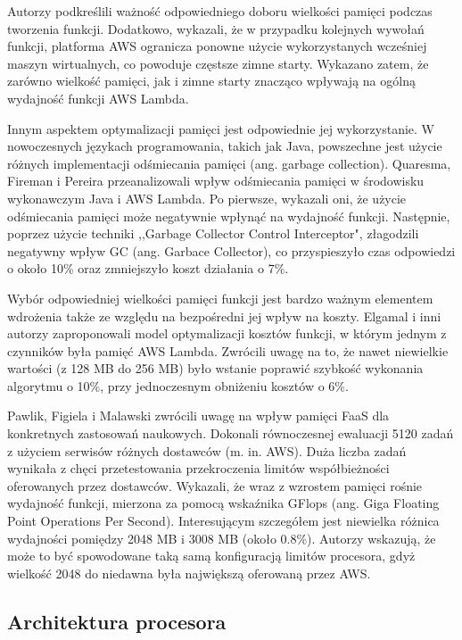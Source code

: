 Autorzy podkreślili ważność odpowiedniego doboru wielkości pamięci podczas tworzenia funkcji. 
Dodatkowo, wykazali, że w przypadku kolejnych wywołań funkcji, platforma AWS ogranicza ponowne użycie wykorzystanych wcześniej maszyn wirtualnych, co powoduje częstsze zimne starty.
Wykazano zatem, że zarówno wielkość pamięci, jak i zimne starty znacząco wpływają na ogólną wydajność funkcji AWS Lambda.

Innym aspektem optymalizacji pamięci jest odpowiednie jej wykorzystanie. 
W nowoczesnych językach programowania, takich jak Java, powszechne jest użycie różnych implementacji odśmiecania pamięci (ang. garbage collection). 
Quaresma, Fireman i Pereira \cite{9235063} przeanalizowali wpływ odśmiecania pamięci w środowisku wykonawczym Java i AWS Lambda. 
Po pierwsze, wykazali oni, że użycie odśmiecania pamięci może negatywnie wpłynąć na wydajność funkcji. 
Następnie, poprzez użycie techniki  ,,Garbage Collector Control Interceptor", złagodzili negatywny wpływ GC (ang. Garbace Collector), co przyspieszyło czas odpowiedzi o około 10\% oraz zmniejszyło koszt działania o 7\%. 

Wybór odpowiedniej wielkości pamięci funkcji jest bardzo ważnym elementem wdrożenia także ze względu na bezpośredni jej wpływ na koszty. Elgamal i inni autorzy \cite{8567674} zaproponowali model optymalizacji kosztów funkcji, w którym jednym z czynników była pamięć AWS Lambda. 
Zwrócili uwagę na to, że nawet niewielkie wartości (z 128 MB do 256 MB) było wstanie poprawić szybkość wykonania algorytmu o 10\%, przy jednoczesnym obniżeniu kosztów o 6\%.

Pawlik, Figiela i Malawski \cite{pawlik2019performanceconsiderationsexecutionlarge} zwrócili uwagę na wpływ pamięci FaaS dla konkretnych zastosowań naukowych. 
Dokonali równoczesnej ewaluacji 5120 zadań z użyciem serwisów różnych dostawców (m. in. AWS). 
Duża liczba zadań wynikała z chęci przetestowania przekroczenia limitów współbieżności oferowanych przez dostawców. 
Wykazali, że wraz z wzrostem pamięci rośnie wydajność funkcji, mierzona za pomocą wskaźnika GFlops (ang. Giga Floating Point Operations Per Second). 
Interesującym szczegółem jest niewielka różnica wydajności pomiędzy 2048 MB i 3008 MB (około 0.8\%). 
Autorzy wskazują, że może to być spowodowane taką samą konfiguracją limitów procesora, gdyż wielkość 2048 do niedawna była największą oferowaną przez AWS.

\subsection*{Architektura procesora}

